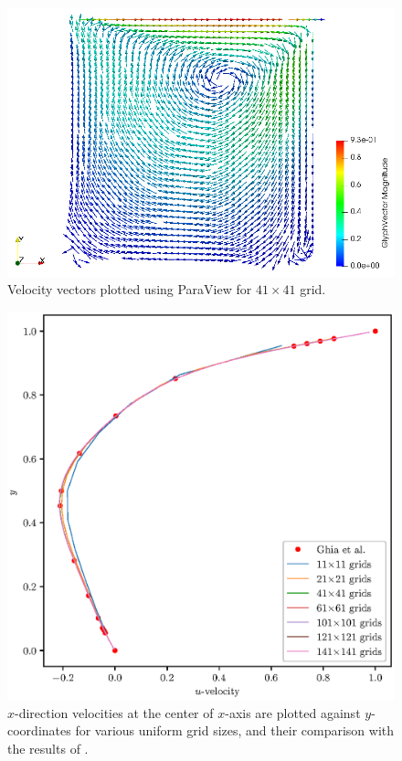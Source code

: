 \documentclass[12pt,a4paper,fleqn]{article}
\begin{document}
\begin{figure}[H]
    \centering
    \includegraphics[width=\linewidth]{2DvelVectors.png}
    \caption{Velocity vectors plotted using ParaView for \(41 \times 41\) grid.}
\end{figure}

\begin{figure}[H]
    \centering
    \includegraphics[width=\linewidth]{2Dfinal18051412_cavityFlowU.eps}
    \caption{\(x\)-direction velocities at the center of \(x\)-axis are plotted against \(y\)-coordinates for various uniform grid sizes, and their comparison with the results of \cite{GHIA1982387}.}
\end{figure}
\end{document}
